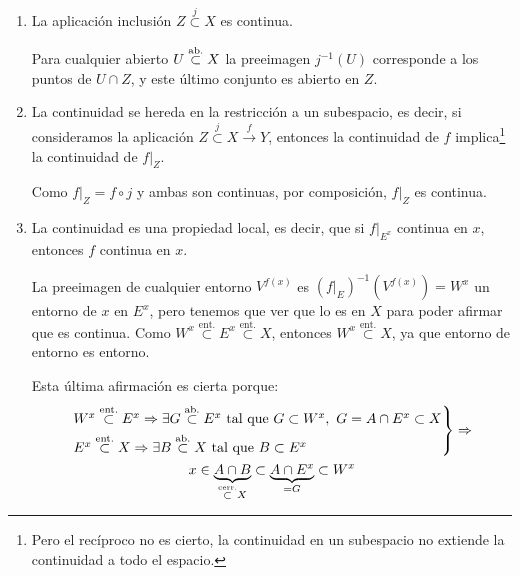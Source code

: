 \begin{obs}
\begin{enumerate}
    \item La aplicación inclusión $Z \stackrel{j}{\subset} X$ es continua.
    \begin{demo}
     Para cualquier abierto $U \stackrel{\text{ab.}}{\subset} X$ la preeimagen $j^{-1}\left( U \right)$ corresponde a los puntos de $U \cap Z$, y este último conjunto es abierto en $Z$.
    \end{demo}

    \item La continuidad se hereda en la restricción a un subespacio, es decir, si consideramos la aplicación $Z \stackrel{j}{\subset} X \xrightarrow{f} Y$, entonces la continuidad de $f$ implica\footnote{Pero el recíproco no es cierto, la continuidad en un subespacio no extiende la continuidad a todo el espacio.} la continuidad de $f|_Z$.
    \begin{demo}
    Como $f|_Z = f \circ j$ y ambas son continuas, por composición, $f|_Z$ es continua.
    \end{demo}

    \item La continuidad es una propiedad local, es decir, que si $f|_{E^x}$ continua en $x$, entonces $f$ continua en $x$.
    \begin{demo}
	La preeimagen de cualquier entorno $V^{f\left( x \right)}$ es $\left( f|_{E} \right)^{-1} \left( V^{f\left( x \right)} \right) = W^x$ un entorno de $x$ en $E^x$, pero tenemos que ver que lo es en $X$ para poder afirmar que es continua.
	Como $W^x \stackrel{\text{ent.}}{\subset} E^x \stackrel{\text{ent.}}{\subset} X$, entonces $W^x \stackrel{\text{ent.}}{\subset}X$, ya que entorno de entorno es entorno.
	
	Esta última afirmación es cierta porque:
        \begin{gather*}
        \begin{rcases}
           	W^x \stackrel{\text{ent.}}{\subset} E^x \Rightarrow \exists G \stackrel{\text{ab.}}{\subset} E^x \mbox{ tal que }G \subset W^x, \ G = A \cap E^x \subset X\\ 
            E^x \stackrel{\text{ent.}}{\subset} X \Rightarrow \exists B \stackrel{\text{ab.}}{\subset} X \mbox{ tal que } B \subset E^x
        \end{rcases}\Rightarrow\\
        x \in \underbrace{A \cap B}_{\stackrel{\text{cerr.}}{\subset} X} \subset \underbrace{A \cap E^x}_{= G}  \subset W^x
        \end{gather*}
    \end{demo}


\end{enumerate}
\end{obs}
